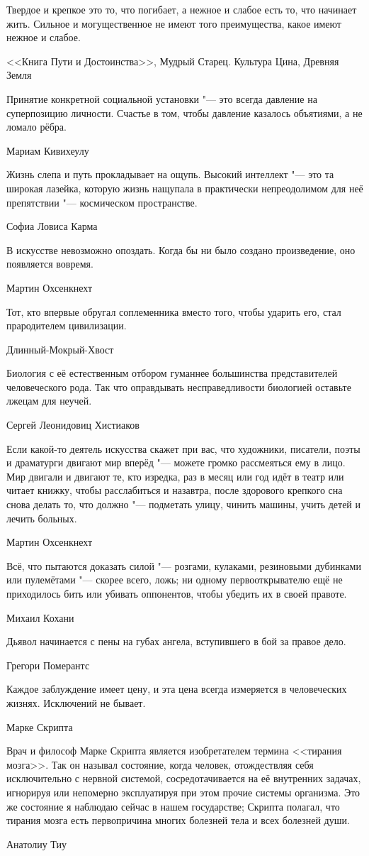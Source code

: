 \epigraph
{Твердое и крепкое это то, что погибает, а нежное и слабое есть то, что начинает жить.
Сильное и могущественное не имеют того преимущества, какое имеют нежное и слабое.}
{<<Книга Пути и Достоинства>>, Мудрый Старец.
Культура Цина, Древняя Земля}

\epigraph
{Принятие конкретной социальной установки "--- это всегда давление на суперпозицию личности.
Счастье в том, чтобы давление казалось объятиями, а не ломало рёбра.}
{Мариам Кивихеулу}

\epigraph
{Жизнь слепа и путь прокладывает на ощупь.
Высокий интеллект "--- это та широкая лазейка, которую жизнь нащупала в практически непреодолимом для неё препятствии "--- космическом пространстве.}
{Софиа Ловиса Карма}

\epigraph
{В искусстве невозможно опоздать.
Когда бы ни было создано произведение, оно появляется вовремя.}
{Мартин Охсенкнехт}

\epigraph
{Тот, кто впервые обругал соплеменника вместо того, чтобы ударить его, стал прародителем цивилизации.}
{Длинный-Мокрый-Хвост}

\epigraph
{Биология с её естественным отбором гуманнее большинства представителей человеческого рода.
Так что оправдывать несправедливости биологией оставьте лжецам для неучей.}
{Сергей Леонидовиц Хистиаков}

\epigraph
{Если какой-то деятель искусства скажет при вас, что художники, писатели, поэты и драматурги двигают мир вперёд "--- можете громко рассмеяться ему в лицо.
Мир двигали и двигают те, кто изредка, раз в месяц или год идёт в театр или читает книжку, чтобы расслабиться и назавтра, после здорового крепкого сна снова делать то, что должно "--- подметать улицу, чинить машины, учить детей и лечить больных.}
{Мартин Охсенкнехт}

\epigraph
{Всё, что пытаются доказать силой "--- розгами, кулаками, резиновыми дубинками или пулемётами "--- скорее всего, ложь;
ни одному первооткрывателю ещё не приходилось бить или убивать оппонентов, чтобы убедить их в своей правоте.}
{Михаил Кохани}

\epigraph
{Дьявол начинается с пены на губах ангела, вступившего в бой за правое дело.}
{Грегори Померантс}

\epigraph
{Каждое заблуждение имеет цену, и эта цена всегда измеряется в человеческих жизнях.
Исключений не бывает.}
{Марке Скрипта}

\epigraph
{Врач и философ Марке Скрипта является изобретателем термина <<тирания мозга>>.
Так он называл состояние, когда человек, отождествляя себя исключительно с нервной системой, сосредотачивается на её внутренних задачах, игнорируя или непомерно эксплуатируя при этом прочие системы организма.
Это же состояние я наблюдаю сейчас в нашем государстве;
Скрипта полагал, что тирания мозга есть первопричина многих болезней тела и всех болезней души.}
{Анатолиу Тиу}

